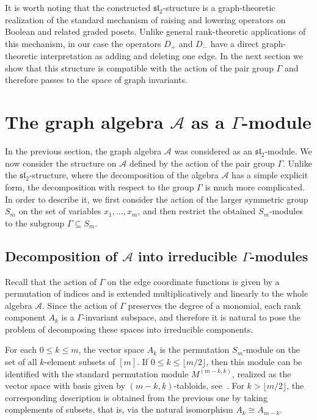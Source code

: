 \documentclass[10pt,a4paper]{amsart}
\begin{document}
\medskip

It is worth noting that the constructed $\mathfrak{sl}_2$-structure is a
graph-theoretic realization of the standard mechanism of raising and lowering
operators on Boolean and related graded posets. Unlike general rank-theoretic
applications of this mechanism, in our case the operators $D_+$ and $D_-$ have
a direct graph-theoretic interpretation as adding and deleting one edge.
In the next section we show that this structure is compatible with the action
of the pair group $\Gamma$ and therefore passes to the space of graph
invariants.




\section{The graph algebra $\mathcal A$ as a 
$\Gamma$-module}


In the previous section, the graph algebra $\mathcal A$ was considered as an
$\mathfrak{sl}_2$-module. We now consider the structure on $\mathcal A$
defined by the action of the pair group
$
\Gamma.
$
Unlike the $\mathfrak{sl}_2$-structure, where the decomposition of the algebra
$\mathcal A$ has a simple explicit form, the decomposition with respect to the
group
$
\Gamma
$
is much more complicated. In order to describe it, we first consider the
action of the larger symmetric group
$
S_m
$
on the set of variables $x_1,\dots,x_m$, and then restrict the obtained
$S_m$-modules to the subgroup $\Gamma\subseteq S_m$.

\subsection{Decomposition of $\mathcal A$ into irreducible 
$\Gamma$-modules}

Recall that the action of $\Gamma$ on the edge coordinate functions is given
by a permutation of indices and is extended multiplicatively and linearly to
the whole algebra $\mathcal A$.
Since the action of $\Gamma$ preserves the degree of a monomial, each rank
component
$
A_k
$
is a $\Gamma$-invariant subspace, and therefore it is natural to pose the
problem of decomposing these spaces into irreducible components.

For each $0\le k\le m$, the vector space $A_k$ is the permutation
$S_m$-module on the set of all $k$-element subsets of $[m]$.
If $0\le k\le \lfloor m/2\rfloor$, then this module can be identified with
the standard permutation module $M^{(m-k,k)}$, realized as the vector space
with basis given by $(m-k,k)$-tabloids, see~\cite{Sagan}.
For $k>\lfloor m/2\rfloor$, the corresponding description is obtained from
the previous one by taking complements of subsets, that is, via the natural
isomorphism $A_k\cong A_{m-k}$.
\end{document}
